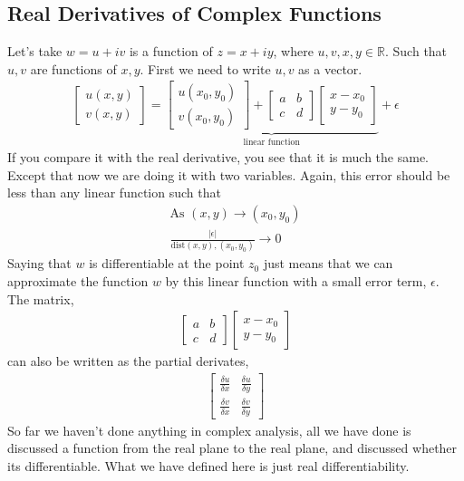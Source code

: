 \documentclass{article}
\begin{document}
\subsection{Real Derivatives of Complex Functions}
Let's take $w = u + iv$ is a function of $z = x + iy$, where $u, v, x, y \in \mathbb{R}$. Such that
$u, v$ are functions of $x,y$. First we need to write $u, v$ as a vector.
\begin{gather*}
	\begin{bmatrix}
		u(x,y) \\
		v(x,y)
	\end{bmatrix}
	=
	\underbrace{
		\begin{bmatrix}
			u(x_0, y_0) \\
			v(x_0, y_0)
		\end{bmatrix}
		+
		\begin{bmatrix}
			a & b \\
			c & d
		\end{bmatrix}
		\begin{bmatrix}
			x - x_0 \\
			y - y_0
		\end{bmatrix}
	}_{\text{linear function}}
	+ \epsilon
\end{gather*}
If you compare it with the real derivative, you see that it is much the same. Except that now we are
doing it with two variables. Again, this error should be less than any linear function such that
\begin{gather*}
	\text{As } (x,y) \rightarrow (x_0,y_0)\\
	\frac{|\epsilon|}{\text{dist}(x,y),(x_0,y_0)} \rightarrow 0
\end{gather*}
Saying that $w$ is differentiable at the point $z_0$ just means that we can approximate the function
$w$ by this linear function with a small error term, $\epsilon$. The matrix,
\begin{gather*}
	\begin{bmatrix}
		a & b \\
		c & d
	\end{bmatrix}
	\begin{bmatrix}
		x - x_0 \\
		y - y_0
	\end{bmatrix}
\end{gather*}
can also be written as the partial derivates,
\begin{gather*}
	\begin{bmatrix}
		\frac{\delta u}{\delta x} & \frac{\delta u}{\delta y} \\
		\frac{\delta v}{\delta x} & \frac{\delta v}{\delta y}
	\end{bmatrix}
\end{gather*}
So far we haven't done anything in complex analysis, all we have done is discussed a function from the
real plane to the real plane, and discussed whether its differentiable. What we have defined here
is just real differentiability.
\end{document}
